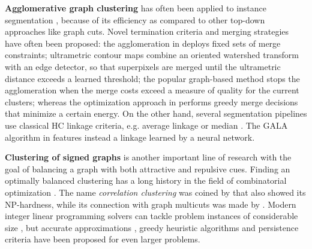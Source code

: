 \textbf{Agglomerative graph clustering} has often been applied to instance segmentation \cite{ren2013image,liu2016image,salembier2000binary}, because of its efficiency as compared to other top-down approaches like graph cuts. 
Novel termination criteria and merging strategies have often been proposed: the agglomeration in \cite{malmberg2011generalized} deploys fixed sets of merge constraints; ultrametric contour maps \cite{arbelaez2011contour} combine an oriented watershed transform with an edge detector, so that superpixels are merged until the ultrametric distance exceeds a learned threshold; the popular graph-based method \cite{felzenszwalb2004efficient} stops the agglomeration when the merge costs exceed a measure of quality for the current clusters; whereas the optimization approach in \cite{kiran2014global} performs greedy merge decisions that minimize a certain energy. 
On the other hand, several segmentation pipelines use classical HC linkage criteria, e.g. average linkage \cite{liu2018affinity,lee2017superhuman} or median \cite{funke2018large}. The GALA algorithm in \cite{nunez2013machine,knowles2016rhoananet} features instead a linkage learned by a neural network.

\textbf{Clustering of signed graphs} is another important line of research with the goal of balancing a graph with both attractive and repulsive cues. Finding an optimally balanced clustering has a long history in the field of combinatorial optimization \cite{grotschel1989cutting,grotschel1990facets,chopra1993partition}. %
The name \emph{correlation clustering} was coined by \cite{bansal2004correlation} that also showed its NP-hardness, while its connection with graph multicuts was made by \cite{demaine2006correlation}. Modern integer linear programming solvers can tackle problem instances of considerable size \cite{andres2012globally}, but accurate approximations \cite{pape2017solving,beier2016efficient,yarkony2012fast}, greedy heuristic algorithms \cite{levinkov2017comparative,wolf2018mutex,keuper2015efficient,kardoostsolving} and persistence criteria \cite{lange2018partial,lange2018combinatorial} have been proposed for even larger problems.

